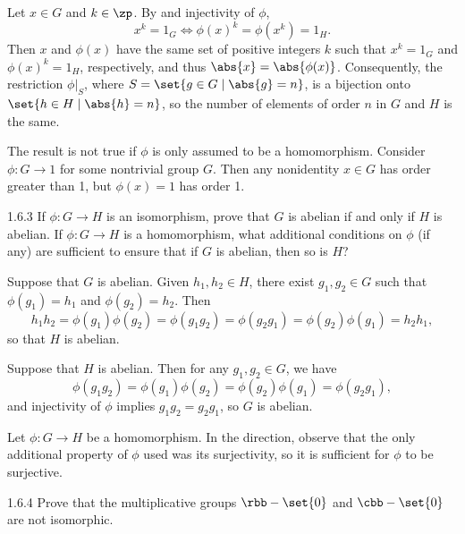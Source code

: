 \begin{sol}
    Let $x \in G$ and $k \in \zp$.
    By  and injectivity of $\phi$,
    \[
        x^k = 1_G \iff \phi(x)^k = \phi(x^k) = 1_H.
    \]
    Then $x$ and $\phi(x)$ have the same set of positive integers $k$ such that $x^k = 1_G$ and $\phi(x)^k = 1_H$, respectively, and thus $\abs{x} = \abs{\phi(x)}$.
    Consequently, the restriction $\phi|_S$, where $S = \set{g \in G \mid \abs{g} = n}$, is a bijection onto $\set{h \in H \mid \abs{h} = n}$, so the number of elements of order $n$ in $G$ and $H$ is the same.

    The result is not true if $\phi$ is only assumed to be a homomorphism.
    Consider $\phi \colon G \to 1$ for some nontrivial group $G$.
    Then any nonidentity $x \in G$ has order greater than 1, but $\phi(x) = 1$ has order 1.
\end{sol}

\begin{exercise}{1.6.3}
    If $\phi \colon G \to H$ is an isomorphism, prove that $G$ is abelian if and only if $H$ is abelian.
	If $\phi \colon G \to H$ is a homomorphism, what additional conditions on $\phi$ (if any) are sufficient to ensure that if $G$ is abelian, then so is $H$?
\end{exercise}

\begin{sol}
    \leavevmode

    \rightimp Suppose that $G$ is abelian.
    Given $h_1, h_2 \in H$, there exist $g_1, g_2 \in G$ such that $\phi(g_1) = h_1$ and $\phi(g_2) = h_2$.
    Then
    \[
        h_1h_2 = \phi(g_1)\phi(g_2) = \phi(g_1g_2) = \phi(g_2g_1) = \phi(g_2)\phi(g_1) = h_2h_1,
    \]
    so that $H$ is abelian.

    \leftimp Suppose that $H$ is abelian.
    Then for any $g_1, g_2 \in G$, we have
    \[
        \phi(g_1g_2) = \phi(g_1)\phi(g_2) = \phi(g_2)\phi(g_1) = \phi(g_2g_1),
    \]
    and injectivity of $\phi$ implies $g_1g_2 = g_2g_1$, so $G$ is abelian.
    
    Let $\phi \colon G \to H$ be a homomorphism.
	In the \rightimp direction, observe that the only additional property of $\phi$ used was its surjectivity, so it is sufficient for $\phi$ to be surjective.
\end{sol}

\begin{exercise}{1.6.4}
    Prove that the multiplicative groups $\rbb - \set{0}$ and $\cbb- \set{0}$ are not isomorphic.
\end{exercise}

